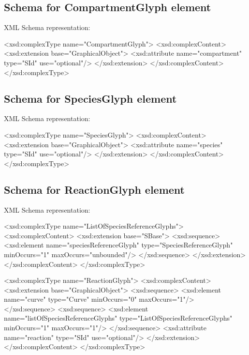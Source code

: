 \subsection{Schema for CompartmentGlyph element}

XML Schema representation:

\begin{example}
<xsd:complexType name="CompartmentGlyph">
 <xsd:complexContent>
  <xsd:extension base="GraphicalObject">
   <xsd:attribute name="compartment" type="SId" use="optional"/>
  </xsd:extension>
 </xsd:complexContent>
</xsd:complexType>
\end{example}

\subsection{Schema for SpeciesGlyph element}

XML Schema representation:

\begin{example}
<xsd:complexType name="SpeciesGlyph">
 <xsd:complexContent>
  <xsd:extension base="GraphicalObject">
   <xsd:attribute name="species" type="SId" use="optional"/>
  </xsd:extension>
 </xsd:complexContent>
</xsd:complexType>
\end{example}

\subsection{Schema for ReactionGlyph element}

XML Schema representation:

\begin{example}
<xsd:complexType name="ListOfSpeciesReferenceGlyphs">
 <xsd:complexContent>
  <xsd:extension base="SBase">  
   <xsd:sequence>
    <xsd:element name="speciesReferenceGlyph" type="SpeciesReferenceGlyph" 
                 minOccurs="1" maxOccurs="unbounded"/>
   </xsd:sequence>
  </xsd:extension>
 </xsd:complexContent>
</xsd:complexType>

<xsd:complexType name="ReactionGlyph">
 <xsd:complexContent>
  <xsd:extension base="GraphicalObject">
   <xsd:sequence>
     <xsd:element name="curve" type="Curve" minOccurs="0" maxOccurs="1"/>
   </xsd:sequence>
   <xsd:sequence>
    <xsd:element name="listOfSpeciesReferenceGlyphs" 
                 type="ListOfSpeciesReferenceGlyphs" 
                 minOccurs="1" maxOccurs="1"/>
   </xsd:sequence>
   <xsd:attribute name="reaction" type="SId" use="optional"/>
  </xsd:extension>
 </xsd:complexContent>
</xsd:complexType>
\end{example}

